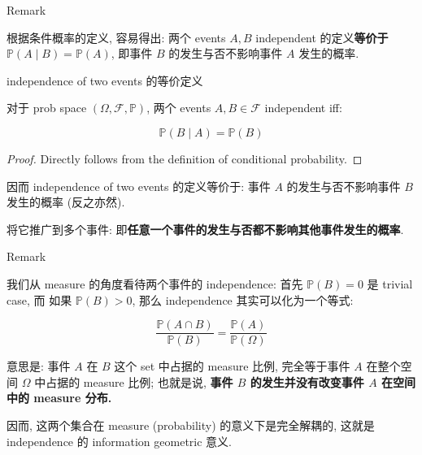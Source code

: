 \documentclass{qlnotes-export}
\begin{document}
\begin{qlremark}{Remark}

根据条件概率的定义, 容易得出: 两个 events \(A,B\) independent 的定义\textbf{等价于 \({\mathbb{P}}(A \mid B) = {\mathbb{P}}(A)\)}, 即事件 \(B\) 的发生与否不影响事件 \(A\) 发生的概率.\\

\begin{proposition}{independence of two events 的等价定义}\label{prop-01-combinatorics-prob-space-independence-of-two-events}

对于 prob space \((\Omega,\mathcal{F},{\mathbb{P}})\), 两个 events \(A,B \in \mathcal{F}\) independent iff:

\[{\mathbb{P}}(B \mid A) = {\mathbb{P}}(B)\]

\end{proposition}

\begin{proof}

Directly follows from the definition of conditional probability.

\end{proof}

因而 independence of two events 的定义等价于: 事件 \(A\) 的发生与否不影响事件 \(B\) 发生的概率 (反之亦然).

将它推广到多个事件: 即\textbf{任意一个事件的发生与否都不影响其他事件发生的概率}.

\end{qlremark}

\begin{qlremark}{Remark}

我们从 measure 的角度看待两个事件的 independence: 首先 \({\mathbb{P}}(B) = 0\) 是 trivial case, 而 如果 \({\mathbb{P}}(B) > 0\), 那么 independence 其实可以化为一个等式:

\[\frac{{\mathbb{P}}(A \cap B)}{{\mathbb{P}}(B)} = \frac{{\mathbb{P}}(A)}{{\mathbb{P}}(\Omega)}\]

意思是: 事件 \(A\) 在 \(B\) 这个 set 中占据的 measure 比例, 完全等于事件 \(A\) 在整个空间 \(\Omega\) 中占据的 measure 比例; 也就是说, \textbf{事件 \(B\) 的发生并没有改变事件 \(A\) 在空间中的 measure 分布.}

因而, 这两个集合在 measure (probability) 的意义下是完全解耦的, 这就是 independence 的 information geometric 意义.

\end{qlremark}
\end{document}
